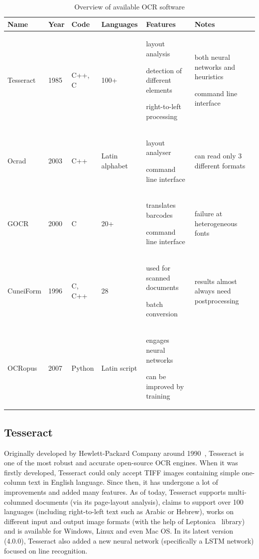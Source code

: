 \begin{table}[t]
{\small
\begin{tabular}{p{4.6em}p{2em}p{3em}p{4.8em}p{7em}p{7em}}
\toprule
\textbf{Name} & \textbf{Year} & \textbf{Code} & \textbf{Languages} & \textbf{Features} & \textbf{Notes}\\
\midrule
Tesseract & 1985 & C++, C & 100+ & 
layout analysis

detection of different elements

right-to-left processing

&

both neural networks and heuristics

command line interface

\\
Ocrad & 2003 & C++ & Latin alphabet &  
layout analyser

command line interface
&
can read only 3 different formats
\\
GOCR & 2000 & C & 20+ &

translates barcodes

command line interface

&
failure at heterogeneous fonts

\\
CuneiForm & 1996 & C, C++ & 28 & 

used for scanned documents

batch conversion

& 
results almost always need postprocessing

\\
OCRopus & 2007 & Python & Latin script & 

engages neural networks

can be improved by training

\\

\bottomrule
\end{tabular}
}
\caption{Overview of available OCR software}
\label{tab:availableSoftware}
\end{table}

\subsection{Tesseract}

Originally developed by Hewlett-Packard Company around 1990~\citep{TesseractGIT}, Tesseract is one of the most robust and accurate open-source OCR engines. When it was firstly developed, Tesseract could only accept TIFF images containing simple one-column text in English language. Since then, it has undergone a lot of improvements and added many features. As of today, Tesseract supports multi-columned documents (via its page-layout analysis), claims to support over 100 languages (including right-to-left text such as Arabic or Hebrew), works on different input and output image formats (with the help of Leptonica~\citep{LeptonicaLIB} library) and is available for Windows, Linux and even Mac OS. In its latest version (4.0.0), Tesseract also added a new neural network (specifically a LSTM network) focused on line recognition. 

